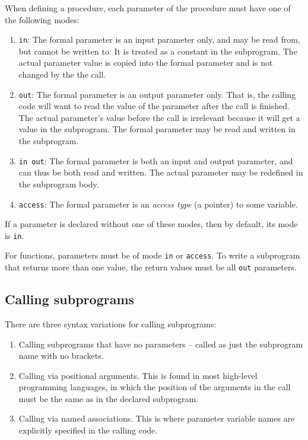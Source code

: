 When defining a procedure, each parameter of the procedure must have one of the following modes:

\begin{enumerate}

\item \texttt{in}: The formal parameter is an input parameter only, and may be read from, but cannot be written to. It is treated as a constant in the subprogram. The actual parameter value is copied into the formal parameter and is not changed by the the call. 

\item \texttt{out}: The formal parameter is an output parameter only. That is, the calling code will want to read the value of the parameter after the call is finished. The actual parameter's value before the call is irrelevant because it will get a value in the subprogram. The formal parameter may be read and written in the subprogram.

\item \texttt{in out}: The formal parameter is both an input and output parameter, and can thus be both read and written. The actual parameter may be redefined in the subprogram body. 

\item \texttt{access}: The formal parameter is an \emph{access type} (a pointer) to some variable.

\end{enumerate}

If a parameter is declared without one of these modes, then by default, its mode is \texttt{in}.

For functions, parameters must be of mode \texttt{in} or \texttt{access}.  To write a subprogram that returns more than one value, the return values must be all \texttt{out} parameters.


\subsection{Calling subprograms}

There are three syntax variations for calling subprograms:

\begin{enumerate}

 \item Calling subprograms that have no parameters -- called as just the subprogram name with no brackets.

 \item Calling via positional arguments. This is found in most high-level programming languages, in which the position of the arguments in the call must be the same as in the declared subprogram.

 \item Calling via named associations. This is where parameter variable names are explicitly specified in the calling code.

\end{enumerate}

